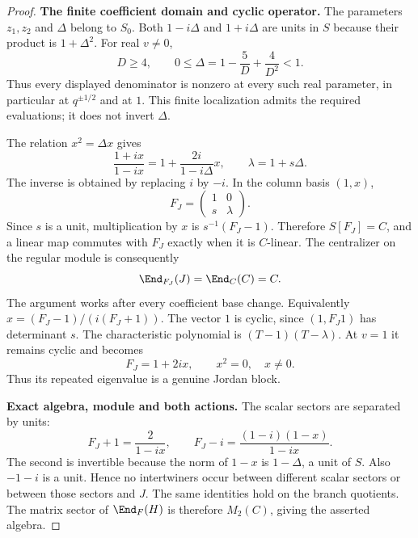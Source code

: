 \documentclass[11pt,a4paper]{article}
\theoremstyle{named}\newtheorem{finding}{Finding}[section]
\theoremstyle{definition}\newtheorem{definition}[finding]{Definition}
\theoremstyle{remark}\newtheorem{remark}[finding]{Remark}
\begin{document}
\begin{proof}
\par\smallskip\noindent\textbf{The finite coefficient domain and cyclic operator.}\quad
The parameters $z_1,z_2$ and $\Delta$ belong to $S_0$. Both $1-i\Delta$ and
$1+i\Delta$ are units in $S$ because their product is
$1+\Delta^2$. For real $v\ne0$,
\[
 D\ge4,\qquad
 0\le\Delta=1-\frac5D+\frac4{D^2}<1.
\]
Thus every displayed denominator is nonzero at every such real
parameter, in particular at $q^{\pm1/2}$ and at $1$. This finite
localization admits the required evaluations; it does not
invert $\Delta$.

The relation $x^2=\Delta x$ gives
\[
 \frac{1+ix}{1-ix}=1+\frac{2i}{1-i\Delta}x,\qquad
 \lambda=1+s\Delta.
\]
The inverse is obtained by replacing $i$ by $-i$.
In the column basis $(1,x)$,
\begin{equation}\label{eq:cayleymatrix}
 F_J=\begin{pmatrix}1&0\\s&\lambda\end{pmatrix}.
\end{equation}
Since $s$ is a unit, multiplication by $x$ is
$s^{-1}(F_J-1)$. Therefore $S[F_J]=C$, and a linear map
commutes with $F_J$ exactly when it is $C$-linear.
The centralizer on the regular module is consequently
\[
 \End_{F_J}(J)=\End_C(C)=C.
\]
The argument works after every coefficient base change.
Equivalently $x=(F_J-1)/(i(F_J+1))$.
The vector $1$ is cyclic, since $(1,F_J1)$ has determinant $s$.
The characteristic polynomial is $(T-1)(T-\lambda)$.
At $v=1$ it remains cyclic and becomes
\[
 F_J=1+2ix,\qquad x^2=0,\quad x\ne0.
\]
Thus its repeated eigenvalue is a genuine Jordan block.

\par\smallskip\noindent\textbf{Exact algebra, module and both actions.}\quad
The scalar sectors are separated by units:
\[
 F_J+1=\frac2{1-ix},\qquad
 F_J-i=\frac{(1-i)(1-x)}{1-ix}.
\]
The second is invertible because the norm of $1-x$ is
$1-\Delta$, a unit of $S$. Also $-1-i$ is a unit.
Hence no intertwiners occur between different scalar sectors
or between those sectors and $J$. The same identities hold
on the branch quotients. The matrix sector of $\End_F(H)$ is
therefore $M_2(C)$, giving the asserted algebra.


\end{proof}
\end{document}
